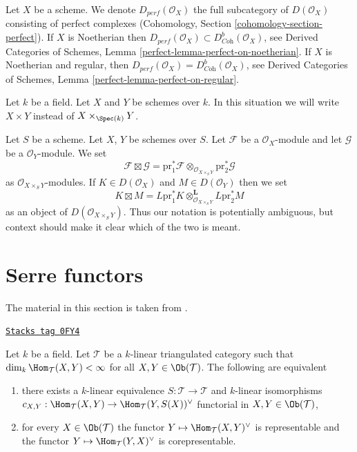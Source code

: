 \medskip\noindent
Let $X$ be a scheme. We denote $D_{perf}(\mathcal{O}_X)$ the full
subcategory of $D(\mathcal{O}_X)$ consisting of perfect complexes
(Cohomology, Section \ref{cohomology-section-perfect}).
If $X$ is Noetherian then
$D_{perf}(\mathcal{O}_X) \subset D^b_{\textit{Coh}}(\mathcal{O}_X)$, see
Derived Categories of Schemes, Lemma \ref{perfect-lemma-perfect-on-noetherian}.
If $X$ is Noetherian and regular, then
$D_{perf}(\mathcal{O}_X) = D^b_{\textit{Coh}}(\mathcal{O}_X)$, see
Derived Categories of Schemes, Lemma \ref{perfect-lemma-perfect-on-regular}.

\medskip\noindent
Let $k$ be a field. Let $X$ and $Y$ be schemes over $k$. In this
situation we will write $X \times Y$ instead of $X \times_{\Spec(k)} Y$.


\medskip\noindent
Let $S$ be a scheme. Let $X$, $Y$ be schemes over $S$.
Let $\mathcal{F}$ be a $\mathcal{O}_X$-module and let
$\mathcal{G}$ be a $\mathcal{O}_Y$-module. We set
$$
\mathcal{F} \boxtimes \mathcal{G} =
\text{pr}_1^*\mathcal{F} \otimes_{\mathcal{O}_{X \times_S Y}}
\text{pr}_2^*\mathcal{G}
$$
as $\mathcal{O}_{X \times_S Y}$-modules.
If $K \in D(\mathcal{O}_X)$ and $M \in D(\mathcal{O}_Y)$ then we set
$$
K \boxtimes M =
L\text{pr}_1^*K \otimes_{\mathcal{O}_{X \times_S Y}}^\mathbf{L} L\text{pr}_2^*M
$$
as an object of $D(\mathcal{O}_{X \times_S Y})$.
Thus our notation is potentially ambiguous, but context should make it clear
which of the two is meant.

\section{Serre functors}
\label{equiv-section-Serre-functors}
The material in this section is taken from \cite{Bondal-Kapranov}.

\begin{lemma}
\label{equiv-lemma-Serre-functor-exists}
\href{https://stacks.math.columbia.edu/tag/0FY4}{\texttt{Stacks tag 0FY4}}

Let $k$ be a field. Let $\mathcal{T}$ be a $k$-linear
triangulated category such that $\dim_k \Hom_\mathcal{T}(X, Y) < \infty$
for all $X, Y \in \Ob(\mathcal{T})$. The following are equivalent
\begin{enumerate}
\item there exists a $k$-linear equivalence
$S : \mathcal{T} \to \mathcal{T}$ and $k$-linear isomorphisms
$c_{X, Y} : \Hom_\mathcal{T}(X, Y) \to \Hom_\mathcal{T}(Y, S(X))^\vee$
functorial in $X, Y \in \Ob(\mathcal{T})$,
\item for every $X \in \Ob(\mathcal{T})$
the functor $Y \mapsto \Hom_\mathcal{T}(X, Y)^\vee$
is representable and the functor $Y \mapsto \Hom_\mathcal{T}(Y, X)^\vee$
is corepresentable.
\end{enumerate}
\end{lemma}

